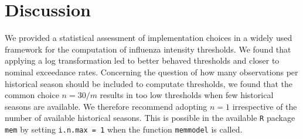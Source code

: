 \documentclass{article}
\begin{document}






\section{Discussion}
\label{sec:discussion}

We provided a statistical assessment of implementation choices in a widely used framework for the computation of influenza intensity thresholds. We found that applying a log transformation led to better behaved thresholds and closer to nominal exceedance rates. Concerning the question of how many observations per historical season should be included to computate thresholds, we found that the common choice $n = 30/m$ results in too low thresholds when few historical seasons are available. We therefore recommend adopting $n = 1$ irrespective of the number of available historical seasons. This is possible in the available \texttt{R} package \texttt{mem} by setting \texttt{i.n.max = 1} when the function \texttt{memmodel} is called.
\end{document}
